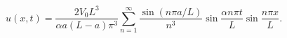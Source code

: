\[u(x,t)=\frac{2V_0L^3}{\alpha a(L-a)\pi^3}\sum_{n=1}^{\infty}\frac{\sin(n\pi a/L)}{n^3}\sin\frac{\alpha n\pi t}{L}\sin\frac{n\pi x}{L}.\]
